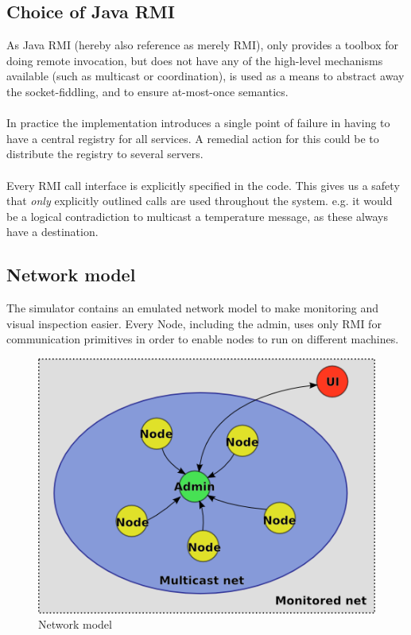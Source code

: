 \documentclass[10pt,a4paper]{article}
\begin{document}
\subsection{Choice of Java RMI}
As Java RMI (hereby also reference as merely RMI), only provides a toolbox for doing remote invocation, but does not have any of the high-level mechanisms available (such as multicast or coordination), is used as a means to abstract away the socket-fiddling, and to ensure at-most-once semantics.\\\\
In practice the implementation introduces a single point of failure in having to have a central registry for all services. A remedial action for this could be to distribute the registry to several servers.\\\\
Every RMI call interface is explicitly specified in the code. This gives us a safety that \emph{only} explicitly outlined calls are used throughout the system. e.g. it would be a logical contradiction to multicast a temperature message, as these always have a destination.

\subsection{Network model}
The simulator contains an emulated network model to make monitoring and visual inspection easier. Every Node, including the admin, uses only RMI for communication primitives in order to enable nodes to run on different machines.

\begin{figure}[h]
\centering
\includegraphics[scale=0.65]{fig/Networkmodel.png}
 \caption{Network model}
 \label{fig:network_model}
\end{figure}
\end{document}
